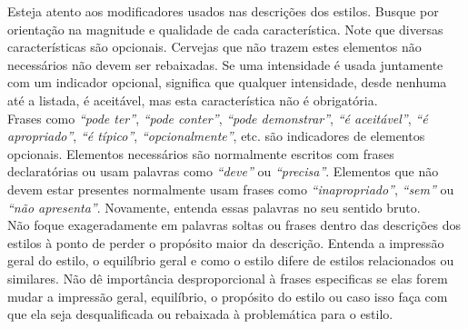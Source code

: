 Esteja atento aos modificadores usados nas descrições dos estilos. Busque por orientação na magnitude e qualidade de cada característica. Note que diversas características são opcionais. Cervejas que não trazem estes elementos não necessários não devem ser rebaixadas. Se uma intensidade é usada juntamente com um indicador opcional, significa que qualquer intensidade, desde nenhuma até a listada, é aceitável, mas esta característica não é obrigatória.\\
Frases como \textit{“pode ter”}, \textit{“pode conter”}, \textit{“pode demonstrar”}, \textit{“é aceitável”}, \textit{“é apropriado”}, \textit{“é típico”}, \textit{“opcionalmente”}, etc. são indicadores de elementos opcionais. Elementos necessários são normalmente escritos com frases declaratórias ou usam palavras como \textit{“deve”} ou \textit{“precisa”}. Elementos que não devem estar presentes normalmente usam frases como \textit{“inapropriado”}, \textit{“sem”} ou \textit{“não apresenta”}. Novamente, entenda essas palavras no seu sentido bruto.\\
Não foque exageradamente em palavras soltas ou frases dentro das descrições dos estilos à ponto de perder o propósito maior da descrição. Entenda a impressão geral do estilo, o equilíbrio geral e como o estilo difere de estilos relacionados ou similares. Não dê importância desproporcional à frases especificas se elas forem mudar a impressão geral, equilíbrio, o propósito do estilo ou caso isso faça com que ela seja desqualificada ou rebaixada à problemática para o estilo.